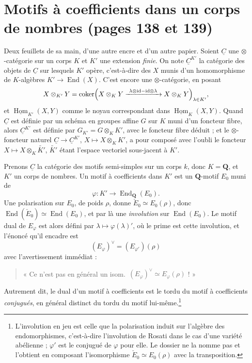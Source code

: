 \documentclass[11pt,a4paper]{article}
\begin{document}
\section*{Motifs à coefficients dans un corps de nombres (pages 138 et 139)}

Deux feuillets de sa main, d'une autre encre et d'un autre papier. Soient
$\underline{C}$ une $\otimes$-catégorie sur un corps $K$ et $K'$ une extension
\emph{finie}. On note $\underline{C}^{K'}$ la catégorie des objets de
$\underline{C}$ sur lesquels $K'$ opère, c'est-à-dire des $X$ munis d'un
homomorphisme de $K$-algèbres $K' \to \operatorname{End}(X)$. C'est encore une
$\otimes$-catégorie, en posant
\[
X \otimes_{K'} Y = \operatorname{coker}\Bigl(
X \otimes_{K} Y \xrightarrow{\ \lambda \otimes \mathrm{id} - \mathrm{id} \otimes \lambda\ }
X \otimes_{K} Y \Bigr)_{\lambda \in K'} ,
\]
et $\underline{\operatorname{Hom}}_{K'}(X,Y)$ comme le noyau correspondant dans
$\underline{\operatorname{Hom}}_{K}(X,Y)$. Quand $\underline{C}$ est définie
par un schéma en groupes affine $G$ sur $K$ muni d'un foncteur fibre, alors
$\underline{C}^{K'}$ est définie par $G_{K'} = G \otimes_{K} K'$, avec le
foncteur fibre déduit ; et le $\otimes$-foncteur naturel $\underline{C} \to
\underline{C}^{K'}$, $X \mapsto X \otimes_{K}K'$, a pour composé avec l'oubli
le foncteur $X \mapsto X \otimes_{K} \widetilde{K'}$, $\widetilde{K'}$ étant
l'espace vectoriel sous-jacent à $K'$.

Prenons $\underline{C}$ la catégorie des motifs semi-simples sur un corps $k$,
donc $K = \mathbf{Q}$, et $K'$ un corps de nombres. Un motif à coefficients
dans $K'$ est un $\mathbf{Q}$-motif $E_{0}$ muni de
\[
\varphi \colon K' \longrightarrow \operatorname{End}_{\mathbf{Q}}(E_{0}) .
\]
Une polarisation sur $E_{0}$, de poids $\rho$, donne $\check{E}_{0} \simeq
E_{0}(\rho)$, donc $\operatorname{End}(\check{E}_{0}) \simeq
\operatorname{End}(E_{0})$, et par là une \emph{involution} sur
$\operatorname{End}(E_{0})$. Le motif dual de $E_{\varphi}$ est alors défini
par $\lambda \mapsto \varphi(\lambda)'$, où le prime est cette involution, et
l'énoncé qu'il encadre est
\[
\boxed{\ (E_{\varphi})^{\vee} = (E_{\varphi'})(\rho)\ }
\]
avec l'avertissement immédiat :
\begin{quote}
« Ce n'est pas en général un isom.\ $(E_{\varphi})^{\vee} \simeq
E_{\varphi}(\rho)$ ! »
\end{quote}
Autrement dit, le dual d'un motif à coefficients est le tordu du motif à
coefficients \emph{conjugués}, en général distinct du tordu du motif lui-même.\footnote{
L'involution en jeu est celle que la polarisation induit sur l'algèbre des
endomorphismes, c'est-à-dire l'involution de Rosati dans le cas d'une variété
abélienne ; $\varphi'$ est le conjugué de $\varphi$ pour elle. Le dossier ne la
nomme pas et l'obtient en composant l'isomorphisme $\check{E}_{0} \simeq
E_{0}(\rho)$ avec la transposition.}
\end{document}
